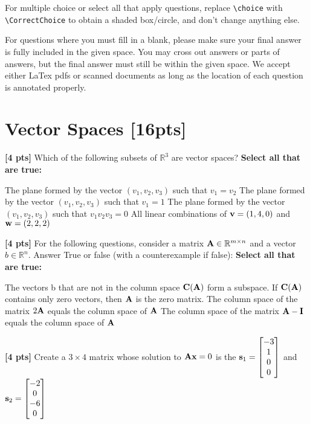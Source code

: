 \documentclass[11pt,addpoints,answers]{exam}
\numberwithin{equation}{section} %
\numberwithin{figure}{section} %
\numberwithin{table}{section} %
\begin{document}
For multiple choice or select all that apply questions, replace \lstinline{\choice} with \lstinline{\CorrectChoice} to obtain a shaded box/circle, and don't change anything else.


For questions where you must fill in a blank, please make sure your final answer is fully included in the given space. You may cross out answers or parts of answers, but the final answer must still be within the given space. We accept either LaTex pdfs or scanned documents as long as the location of each question is annotated properly.


\clearpage

\section{Vector Spaces  [16pts]}
\begin{questions}

\question \textbf{[4 pts]} Which of the following subsets of $\mathbb{R}^3$ are vector spaces?
    \textbf{Select all that are true:} 
    \checkboxchar{$\Box$} \checkedchar{$\blacksquare$}
    \begin{checkboxes}
        \choice The plane formed by the vector $(v_1, v_2, v_3) $ such that $v_1 = v_2$
        \choice The plane formed by the vector $(v_1, v_2, v_3) $ such that $v_1 = 1$
        \choice The plane formed by the vector $(v_1, v_2, v_3) $  such that $v_1 v_2 v_3 = 0$
        \choice All linear combinations of $\mathbf{v} = (1, 4, 0)$ and $\mathbf{w} = (2, 2, 2)$
    \end{checkboxes}

\question \textbf{[4 pts]} For the following questions, consider a matrix $\mathbf{A} \in \mathbb{R}^{m \times n}$ and a vector $b \in \mathbb{R}^n$. Answer True or false (with a counterexample if false):
    \textbf{Select all that are true:} 
    \begin{checkboxes}
        \choice The vectors b that are not in the column space $\mathbf{C}(\mathbf{A})$ form a subspace.
        \choice If $\mathbf{C}(\mathbf{A})$ contains only zero vectors, then $\mathbf{A}$ is the zero matrix.
        \choice The column space of the matrix $2\mathbf{A}$ equals the column space of $\mathbf{A}$
        \choice The column space of the matrix $\mathbf{A} - \mathbf{I}$ equals the column space of $\mathbf{A}$
    \end{checkboxes}

\question \textbf{[4 pts]} Create a $3 \times 4$ matrix whose solution to $\mathbf{A} \mathbf{x} = 0$ is the $\mathbf{s}_1=\begin{bmatrix}
         -3 \\
         1 \\
         0 \\
         0
        \end{bmatrix}$ and $\mathbf{s}_2=\begin{bmatrix}
         -2 \\
         0 \\
         -6 \\
         0
        \end{bmatrix}$


\end{questions}
\end{document}
